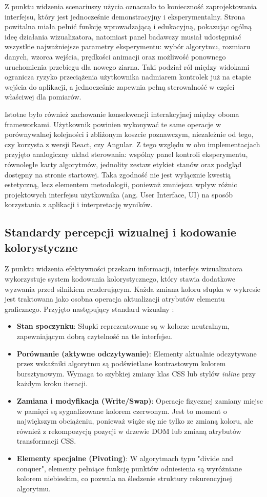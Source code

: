 \documentclass[12pt,openright,twoside]{report}
\begin{document}
  Z punktu widzenia scenariuszy użycia oznaczało to konieczność zaprojektowania interfejsu, który jest jednocześnie demonstracyjny i eksperymentalny. Strona powitalna miała pełnić funkcję wprowadzającą i edukacyjną, pokazując ogólną ideę działania wizualizatora, natomiast panel badawczy musiał udostępniać wszystkie najważniejsze parametry eksperymentu: wybór algorytmu, rozmiaru danych, wzorca wejścia, prędkości animacji oraz możliwość ponownego uruchomienia przebiegu dla nowego ziarna. Taki podział ról między widokami ogranicza ryzyko przeciążenia użytkownika nadmiarem kontrolek już na etapie wejścia do aplikacji, a jednocześnie zapewnia pełną sterowalność w części właściwej dla pomiarów.

  Istotne było również zachowanie konsekwencji interakcyjnej między oboma frameworkami. Użytkownik powinien wykonywać te same operacje w porównywalnej kolejności i zbliżonym koszcie poznawczym, niezależnie od tego, czy korzysta z wersji React, czy Angular. Z tego względu w obu implementacjach przyjęto analogiczny układ sterowania: wspólny panel kontroli eksperymentu, równoległe karty algorytmów, jednolity zestaw etykiet stanów oraz podgląd dostępny na stronie startowej. Taka zgodność nie jest wyłącznie kwestią estetyczną, lecz elementem metodologii, ponieważ zmniejsza wpływ różnic projektowych interfejsu użytkownika (ang. User Interface, UI) na sposób korzystania z aplikacji i interpretację wyników.

\subsection{Standardy percepcji wizualnej i kodowanie kolorystyczne}
Z punktu widzenia efektywności przekazu informacji, interfejs wizualizatora wykorzystuje system kodowania kolorystycznego, który stawia dodatkowe wyzwania przed silnikiem renderującym. Każda zmiana koloru słupka w wykresie jest traktowana jako osobna operacja aktualizacji atrybutów elementu graficznego. Przyjęto następujący standard wizualny \cite{Refactoring_UI, Nielsen_Usability}:
\begin{itemize}
    \item \textbf{Stan spoczynku}: Słupki reprezentowane są w kolorze neutralnym, zapewniającym dobrą czytelność na tle interfejsu.
    \item \textbf{Porównanie (aktywne odczytywanie)}: Elementy aktualnie odczytywane przez wskaźniki algorytmu są podświetlane kontrastowym kolorem bursztynowym. Wymaga to szybkiej zmiany klas CSS lub stylów \textit{inline} przy każdym kroku iteracji.
    \item \textbf{Zamiana i modyfikacja (Write/Swap)}: Operacje fizycznej zamiany miejsc w pamięci są sygnalizowane kolorem czerwonym. Jest to moment o największym obciążeniu, ponieważ wiąże się nie tylko ze zmianą koloru, ale również z rekompozycją pozycji w drzewie DOM lub zmianą atrybutów transformacji CSS.
    \item \textbf{Elementy specjalne (Pivoting)}: W algorytmach typu "divide and conquer", elementy pełniące funkcję punktów odniesienia są wyróżniane kolorem niebieskim, co pozwala na śledzenie struktury rekurencyjnej algorytmu.
\end{itemize}
\end{document}
